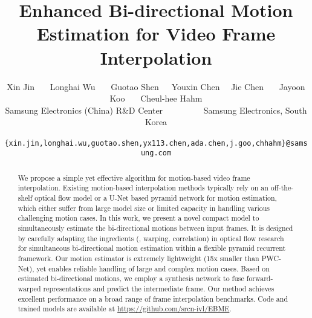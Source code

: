 \documentclass[10pt,twocolumn,letterpaper]{article}
\begin{document}
\title{Enhanced Bi-directional Motion Estimation for Video Frame Interpolation}




\author{Xin Jin ~~~Longhai Wu ~~~Guotao Shen~~~Youxin Chen ~~Jie
    Chen ~~~Jayoon Koo ~~~Cheul-hee Hahm \\ Samsung Electronics
    (China) R\&D Center ~~~~~~~~~Samsung Electronics, South Korea \\
    {\tt\small
    \{xin.jin,longhai.wu,guotao.shen,yx113.chen,ada.chen,j.goo,chhahm\}@samsung.com}
}







\begin{abstract}

    We propose a simple yet effective algorithm for motion-based video frame
    interpolation. Existing motion-based interpolation methods typically rely on
    an off-the-shelf optical flow model or a U-Net based pyramid network for
    motion estimation, which either suffer from large model size or limited
    capacity in handling various challenging motion cases. In this work, we
    present a novel compact model to simultaneously estimate the bi-directional
    motions between input frames. It is designed by carefully adapting the
    ingredients (\eg, warping, correlation) in optical flow research for
    simultaneous bi-directional motion estimation within a flexible pyramid
    recurrent framework. Our motion estimator is extremely lightweight (15x
    smaller than PWC-Net), yet enables reliable handling of large and complex
    motion cases. Based on estimated bi-directional motions, we employ a
    synthesis network to fuse forward-warped representations and predict the
    intermediate frame. Our method achieves excellent performance on a broad
    range of frame interpolation benchmarks. Code and trained models are
    available at \url{https://github.com/srcn-ivl/EBME}.


\end{abstract}
\end{document}

